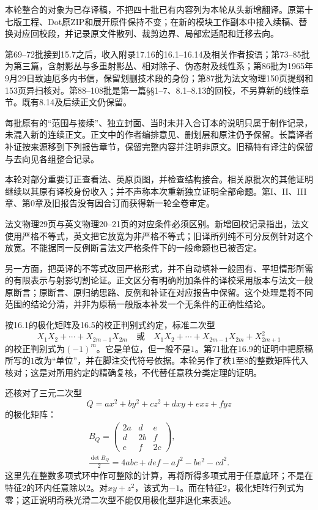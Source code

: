 
本轮整合的对象为已存译稿，不把四十批已有内容列为本轮从头新增翻译。原第十七版工程、Dot原ZIP和展开原件保持不变；在新的模块工作副本中接入续稿、替换对应回校段，并记录原文件散列、裁剪边界、局部宏适配和迁移去向。

第69--72批接到15.7之后，收入附录17.16的16.1--16.14及相关作者按语；第73--85批为第三篇，含射影丛与多重射影丛、相对除子、伪态射及线性系；第86批为1965年9月29日致迪厄多内书信，保留划删技术段的身份；第87批为法文物理150页提纲和153页异扫核对。第88--108批是第一篇§§1--7、8.1--8.13的回校，不另算新的线性章节。既有8.14及后续正文仍保留。

每批原有的“范围与接续”、独立封面、当时未并入合订本的说明只属于制作记录，未混入新的连续正文。正文中的作者编排意见、删划层和原注仍予保留。长篇译者补证按来源移到下列报告章节，保留完整内容并注明非原文。旧稿特有译注的保留与去向见各组整合记录。

本轮对部分重要订正查看法、英原页图，并检查结构接合。相关原批次的其他证明继续以其原有译校身份收入；并不声称本次重新独立证明全部命题。第I、II、III章、第0章及旧报告没有因合订而获得新一轮全卷审定。

法文物理29页与英文物理20--21页的对应条件必须区别。新增回校记录指出，法文使用严格不等式，英文把它放宽为非严格不等式；旧译所列纯不可分反例针对这个放宽。不能据同一反例断言法文严格条件下的一般命题也已被否定。

另一方面，把英译的不等式改回严格形式，并不自动填补一般固有、平坦情形所需的有限表示与射影切割论证。正文区分有明确附加条件的译校采用版本与法文一般原断言；原断言、原归纳思路、反例和补证在对应报告中保留。这个处理是将不同范围的结论分清，并非为原稿一般版本补发一个无条件的正确性结论。

按16.1的极化矩阵及16.5的校正判别式约定，标准二次型
\[
 X_1X_2+\cdots+X_{2m-1}X_{2m}
 \quad\text{或}\quad
 X_1X_2+\cdots+X_{2m-1}X_{2m}+X_{2m+1}^2
\]
的校正判别式为$(-1)^m$。它是单位，但一般不是$1$。第71批在16.9的证明中把原稿所写的$1$改为“单位”，并在脚注交代符号依据。本轮另作了秩1至8的整数矩阵代入核对；这是对所用约定的精确复核，不代替任意秩分类定理的证明。

还核对了三元二次型
\[
 Q=ax^2+by^2+cz^2+dxy+exz+fyz
\]
的极化矩阵：
\[
 \begin{gathered}
 B_Q=\begin{pmatrix}2a&d&e\\d&2b&f\\e&f&2c\end{pmatrix},\\[.4em]
 \frac{\det B_Q}{2}=4abc+def-af^2-be^2-cd^2.
 \end{gathered}
\]
这里先在整数多项式环中作可整除的计算，再将所得多项式用于任意底环；不是在特征2的环内任意除以$2$。对$xy+z^2$，该式为$-1$。而在特征2，极化矩阵行列式为零；这正说明奇秩光滑二次型不能仅用极化型非退化来表述。

